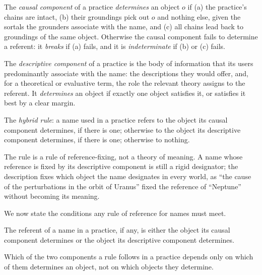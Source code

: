 \documentclass{situationist-preprint}
\begin{document}
\begin{definition}\label{d:causal}
The \emph{causal component} of a practice \emph{determines} an object $o$ if (a) the practice's chains are intact, (b) their groundings pick out $o$ and nothing else, given the sortals the grounders associate with the name, and (c) all chains lead back to groundings of the same object. Otherwise the causal component fails to determine a referent: it \emph{breaks} if (a) fails, and it is \emph{indeterminate} if (b) or (c) fails.
\end{definition}

\begin{definition}\label{d:desc}
The \emph{descriptive component} of a practice is the body of information that its users predominantly associate with the name: the descriptions they would offer, and, for a theoretical or evaluative term, the role the relevant theory assigns to the referent. It \emph{determines} an object if exactly one object satisfies it, or satisfies it best by a clear margin.
\end{definition}

\begin{definition}\label{d:hybrid}
The \emph{hybrid rule}: a name used in a practice refers to the object its causal component determines, if there is one; otherwise to the object its descriptive component determines, if there is one; otherwise to nothing.
\end{definition}

The rule is a rule of reference-fixing, not a theory of meaning. A name whose reference is fixed by its descriptive component is still a rigid designator; the description fixes which object the name designates in every world, as \enquote{the cause of the perturbations in the orbit of Uranus} fixed the reference of \enquote{Neptune} without becoming its meaning.

We now state the conditions any rule of reference for names must meet.

\begin{principle}[Selection]\label{p:select}
The referent of a name in a practice, if any, is either the object its causal component determines or the object its descriptive component determines.
\end{principle}

\begin{principle}[Invariance]\label{p:invariance}
Which of the two components a rule follows in a practice depends only on which of them determines an object, not on which objects they determine.
\end{principle}
\end{document}
